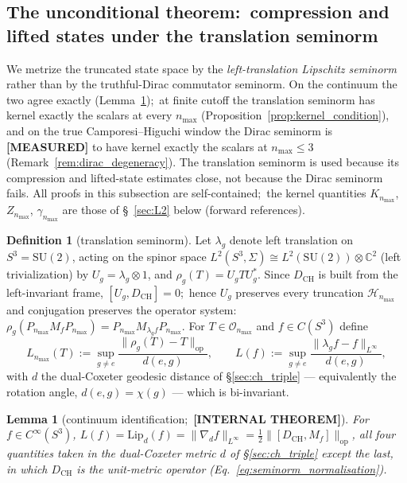 \documentclass[11pt,a4paper]{article}
\theoremstyle{plain}
\newtheorem{lemma}[theorem]{Lemma}
\theoremstyle{definition}
\newtheorem{definition}[theorem]{Definition}
\newcommand{\nmax}{n_{\max}}
\newcommand{\sthree}{S^{3}}
\newcommand{\Hilb}{\mathcal{H}}
\newcommand{\Op}{\mathcal{O}}
\newcommand{\opnorm}[1]{\lVert #1 \rVert_{\mathrm{op}}}
\newcommand{\norm}[1]{\lVert #1 \rVert}
\newcommand{\C}{\mathbb{C}}
\newcommand{\SU}{\mathrm{SU}}
\newcommand{\DCH}{D_{\mathrm{CH}}}
\newcommand{\KS}{K}
\begin{document}
\subsection{The unconditional theorem:\ compression and lifted
states under the translation seminorm}\label{sec:named_gaps}

We metrize the truncated state space by
the \emph{left-translation Lipschitz seminorm} rather than by the
truthful-Dirac commutator seminorm. On the continuum the two agree
exactly (Lemma~\ref{lem:continuum_lip});\ at finite cutoff the
translation seminorm has kernel exactly the scalars at every $\nmax$
(Proposition~\ref{prop:kernel_condition}), and on the true
Camporesi--Higuchi window the Dirac seminorm is \textbf{[MEASURED]} to
have kernel exactly the scalars at $\nmax \le 3$
(Remark~\ref{rem:dirac_degeneracy}). The translation seminorm is used
because its compression and lifted-state estimates close, not because
the Dirac seminorm fails. All proofs in
this subsection are self-contained;\ the kernel quantities
$\KS_{\nmax}$, $Z_{\nmax}$, $\gamma_{\nmax}$ are those of
\S~\ref{sec:L2} below (forward references).

\begin{definition}[translation seminorm]
\label{def:translation_seminorm}
Let $\lambda_g$ denote left translation on $\sthree = \SU(2)$, acting
on the spinor space $L^2(\sthree, \Sigma) \cong L^2(\SU(2)) \otimes
\C^2$ (left trivialization) by $U_g = \lambda_g \otimes 1$, and
$\rho_g(T) = U_g T U_g^*$. Since $\DCH$ is built from the
left-invariant frame, $[U_g, \DCH] = 0$;\ hence $U_g$ preserves every
truncation $\Hilb_{\nmax}$ and conjugation preserves the operator
system:\ $\rho_g(P_{\nmax} M_f P_{\nmax}) = P_{\nmax}
M_{\lambda_g f} P_{\nmax}$. For $T \in \Op_{\nmax}$ and
$f \in C(\sthree)$ define
\begin{equation}
L_{\nmax}(T) := \sup_{g \ne e}
\frac{\opnorm{\rho_g(T) - T}}{d(e, g)},
\qquad
L(f) := \sup_{g \ne e}
\frac{\norm{\lambda_g f - f}_{L^\infty}}{d(e, g)},
\end{equation}
with $d$ the dual-Coxeter geodesic distance of
\S\ref{sec:ch_triple} --- equivalently the rotation angle,
$d(e, g) = \chi(g)$ --- which is bi-invariant.
\end{definition}

\begin{lemma}[continuum identification;\ \textbf{[INTERNAL THEOREM]}]\label{lem:continuum_lip}
For $f \in C^\infty(\sthree)$,
$L(f) = \mathrm{Lip}_d(f) = \norm{\nabla_d f}_{L^\infty}
= \tfrac{1}{2}\opnorm{[\DCH, M_f]}$, all four quantities taken in the
dual-Coxeter metric $d$ of \S\ref{sec:ch_triple} except the last, in
which $\DCH$ is the unit-metric operator
(Eq.~\eqref{eq:seminorm_normalisation}).
\end{lemma}
\end{document}
